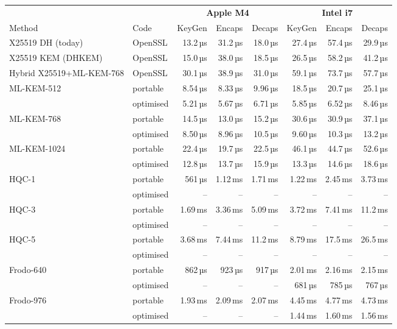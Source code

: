 \begin{tabular}{llrrrrrr}
\toprule
 & & \multicolumn{3}{c}{\textbf{Apple M4}} & \multicolumn{3}{c}{\textbf{Intel i7}} \\ \cmidrule(lr){3-5}\cmidrule(lr){6-8}
Method & Code & KeyGen & Encaps & Decaps & KeyGen & Encaps & Decaps \\
\midrule
X25519 DH (today) & OpenSSL & 13.2\,µs & 31.2\,µs & 18.0\,µs & 27.4\,µs & 57.4\,µs & 29.9\,µs \\
X25519 KEM (DHKEM) & OpenSSL & 15.0\,µs & 38.0\,µs & 18.5\,µs & 26.5\,µs & 58.2\,µs & 41.2\,µs \\
Hybrid X25519+ML-KEM-768 & OpenSSL & 30.1\,µs & 38.9\,µs & 31.0\,µs & 59.1\,µs & 73.7\,µs & 57.7\,µs \\
\midrule
ML-KEM-512 & portable & 8.54\,µs & 8.33\,µs & 9.96\,µs & 18.5\,µs & 20.7\,µs & 25.1\,µs \\
 & optimised & 5.21\,µs & 5.67\,µs & 6.71\,µs & 5.85\,µs & 6.52\,µs & 8.46\,µs \\
ML-KEM-768 & portable & 14.5\,µs & 13.0\,µs & 15.2\,µs & 30.6\,µs & 30.9\,µs & 37.1\,µs \\
 & optimised & 8.50\,µs & 8.96\,µs & 10.5\,µs & 9.60\,µs & 10.3\,µs & 13.2\,µs \\
ML-KEM-1024 & portable & 22.4\,µs & 19.7\,µs & 22.5\,µs & 46.1\,µs & 44.7\,µs & 52.6\,µs \\
 & optimised & 12.8\,µs & 13.7\,µs & 15.9\,µs & 13.3\,µs & 14.6\,µs & 18.6\,µs \\
\midrule
HQC-1 & portable & 561\,µs & 1.12\,ms & 1.71\,ms & 1.22\,ms & 2.45\,ms & 3.73\,ms \\
 & optimised & – & – & – & – & – & – \\
HQC-3 & portable & 1.69\,ms & 3.36\,ms & 5.09\,ms & 3.72\,ms & 7.41\,ms & 11.2\,ms \\
 & optimised & – & – & – & – & – & – \\
HQC-5 & portable & 3.68\,ms & 7.44\,ms & 11.2\,ms & 8.79\,ms & 17.5\,ms & 26.5\,ms \\
 & optimised & – & – & – & – & – & – \\
\midrule
Frodo-640 & portable & 862\,µs & 923\,µs & 917\,µs & 2.01\,ms & 2.16\,ms & 2.15\,ms \\
 & optimised & – & – & – & 681\,µs & 785\,µs & 767\,µs \\
Frodo-976 & portable & 1.93\,ms & 2.09\,ms & 2.07\,ms & 4.45\,ms & 4.77\,ms & 4.73\,ms \\
 & optimised & – & – & – & 1.44\,ms & 1.60\,ms & 1.56\,ms \\

\end{tabular}
